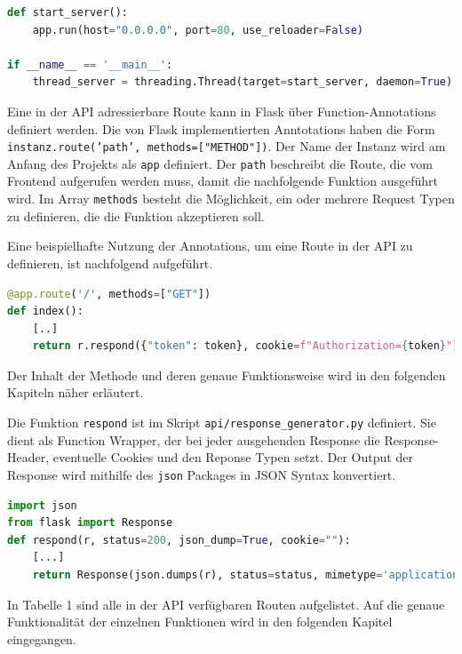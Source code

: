 \begin{lstlisting}[language=Python]
def start_server():
    app.run(host="0.0.0.0", port=80, use_reloader=False)

if __name__ == '__main__':
    thread_server = threading.Thread(target=start_server, daemon=True).start()
\end{lstlisting}

Eine in der API adressierbare Route kann in Flask über Function-Annotations definiert werden. Die von Flask implementierten Anntotations haben die Form \texttt{instanz.route('path', methods=["METHOD"])}. Der Name der Instanz wird am Anfang des Projekts als \texttt{app} definiert. Der \texttt{path} beschreibt die Route, die vom Frontend aufgerufen werden muss, damit die nachfolgende Funktion ausgeführt wird. Im Array \texttt{methods} besteht die Möglichkeit, ein oder mehrere Request Typen zu definieren, die die Funktion akzeptieren soll.

Eine beispielhafte Nutzung der Annotations, um eine Route in der API zu definieren, ist nachfolgend aufgeführt. 

\begin{lstlisting}[language=Python]
@app.route('/', methods=["GET"])
def index():
    [..]
    return r.respond({"token": token}, cookie=f"Authorization={token}")
\end{lstlisting}

Der Inhalt der Methode und deren genaue Funktionsweise wird in den folgenden Kapiteln näher erläutert.

Die Funktion \texttt{respond} ist im Skript \texttt{api/response\_{}generator.py} definiert. Sie dient als Function Wrapper, der bei jeder ausgehenden Response die Response-Header, eventuelle Cookies und den Reponse Typen setzt. Der Output der Response wird mithilfe des \texttt{json} Packages in JSON Syntax konvertiert.

\begin{lstlisting}[language=Python]
import json
from flask import Response
def respond(r, status=200, json_dump=True, cookie=""):
    [...]
    return Response(json.dumps(r), status=status, mimetype='application/json', headers=headers)
\end{lstlisting}

In Tabelle 1 sind alle in der API verfügbaren Routen aufgelistet. Auf die genaue Funktionalität der einzelnen Funktionen wird in den folgenden Kapitel eingegangen.

